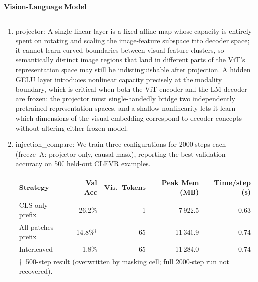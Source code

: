 \documentclass[11pt]{article}
\newenvironment{question}[1]
    {
        \begin{center}
        \textbf{#1} \rmfamily
        \bigskip
        \hrule
    }
    {
        \end{center}
    }
\begin{document}
\begin{question}{Vision-Language Model}
\begin{enumerate}[label=(\alph*)]

    \item projector: A single linear layer is a fixed affine map whose capacity is entirely spent on rotating and scaling the image-feature subspace into decoder space; it cannot learn curved boundaries between visual-feature clusters, so semantically distinct image regions that land in different parts of the ViT's representation space may still be indistinguishable after projection. A hidden GELU layer introduces nonlinear capacity precisely at the modality boundary, which is critical when both the ViT encoder and the LM decoder are frozen: the projector must single-handedly bridge two independently pretrained representation spaces, and a shallow nonlinearity lets it learn which dimensions of the visual embedding correspond to decoder concepts without altering either frozen model.

    \item injection\_compare: We train three configurations for 2000 steps each (freeze~A: projector only, causal mask), reporting the best validation accuracy on 500 held-out CLEVR examples.

    \begin{center}
    \begin{tabular}{lrrrr}
    \toprule
    Strategy & Val Acc & Vis.\ Tokens & Peak Mem (MB) & Time/step (s) \\
    \midrule
    CLS-only prefix     & 26.2\% & 1  & 7\,922.5  & 0.63 \\
    All-patches prefix  & 14.8\%$^\dagger$ & 65 & 11\,340.9 & 0.74 \\
    Interleaved         &  1.8\% & 65 & 11\,284.0 & 0.74 \\
    \bottomrule
    \multicolumn{5}{l}{\footnotesize $\dagger$~500-step result (overwritten by masking cell; full 2000-step run not recovered).}
    \end{tabular}
    \end{center}


\end{enumerate}
\end{question}
\end{document}
